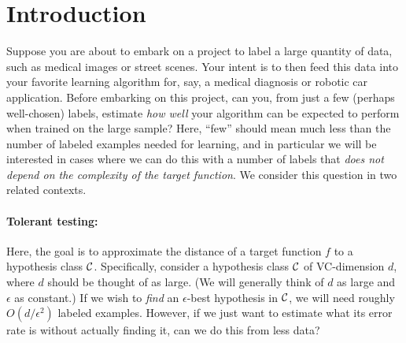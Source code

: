 \section{Introduction}
Suppose you are about to embark on a project to label a large quantity of data, such as medical images or street scenes.  Your intent is to then feed this data into your favorite learning algorithm for, say, a medical diagnosis or robotic car application.  Before embarking on this project, can you, from just a few (perhaps well-chosen) labels, estimate {\em how well} your algorithm can be expected to perform when trained on the large sample?   Here, ``few'' should mean much less than the number of labeled examples needed for learning, and in particular we will be interested in cases where we can do this with a number of labels that {\em does not depend on the complexity of the target function}.
We consider this question in two related  contexts.  

\paragraph{Tolerant testing:} Here, the goal is to approximate the distance of a target function $f$ to a hypothesis class ${\mathcal{C}}$.  Specifically, consider a hypothesis class ${\mathcal{C}}$ of VC-dimension $d$, where $d$ should be thought of as large.  (We will generally think of $d$ as large and $\epsilon$ as constant.)   If we wish to {\em find} an $\epsilon$-best hypothesis in ${\mathcal{C}}$, we will need roughly $O(d/\epsilon^2)$ labeled examples.
However, if we just want to estimate what its error rate is without actually finding it, can we do this from less data? 



